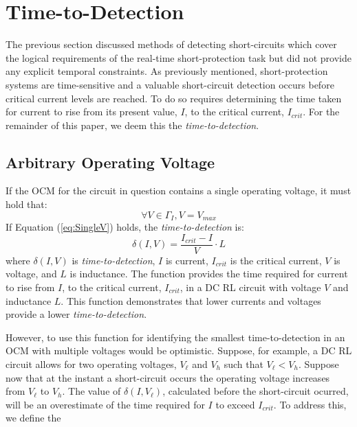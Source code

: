 \documentclass[11pt,oneside]{report}
\begin{document}
    \section*{Time-to-Detection}
    The previous section discussed methods of detecting short-circuits which cover the logical requirements of the real-time short-protection task but did not provide any explicit temporal constraints. As previously mentioned, short-protection systems are time-sensitive and a valuable short-circuit detection occurs before critical current levels are reached. To do so requires determining the time taken for current to rise from its present value, $I$, to the critical current, $I_{crit}$. For the remainder of this paper, we deem this the \textit{time-to-detection}.
    
    \subsection*{Arbitrary Operating Voltage}
    If the OCM for the circuit in question contains a single operating voltage, it must hold that:
    \begin{equation}\label{eq:SingleV}
    \forall  V  \in \Gamma_{I}, V = V_{max}
    \end{equation}
    If Equation (\ref{eq:SingleV}) holds, the \textit{time-to-detection}  is:
    \begin{equation}\label{eq:TimeToDetect}
    \delta(I,V) = \frac{I_{crit}-I}{V}\cdot L
    \end{equation}
    where $\delta(I,V)$ is \textit{time-to-detection}, $I$ is current, $I_{crit}$ is the critical current, $V$ is voltage, and $L$ is inductance. The function provides the time required for current to rise from $I$, to the critical current, $I_{crit}$, in a DC RL circuit with voltage $V$ and inductance $L$. This function demonstrates that lower currents and voltages provide a lower \textit{time-to-detection}.
     
    However, to use this function for identifying the smallest time-to-detection in an OCM with multiple voltages would be optimistic. Suppose, for example, a DC RL circuit allows for two operating voltages, $V_\ell$ and $V_h$ such that $V_\ell < V_h$. Suppose now that at the instant a short-circuit occurs the operating voltage increases from $V_\ell$ to $V_h$. The value of $\delta(I,V_\ell)$, calculated before the short-circuit ocurred, will be an overestimate of the time required for $I$ to exceed $I_{crit}$. To address this, we define the 
    
\end{document}
